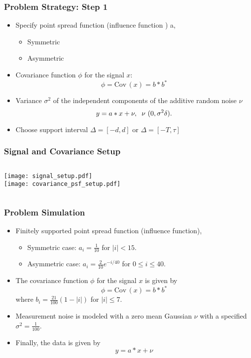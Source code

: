 \documentclass[t]{beamer}
\begin{document}
\begin{frame}
\frametitle{Problem Strategy: Step 1}
\begin{itemize}
\item Specify point spread function (influence function ) a, 
\begin{itemize}
\item Symmetric
\item Asymmetric
\end{itemize}
\item Covariance function $\phi$ for the signal $x$: 
\begin{equation}
\phi = \mathrm{Cov}\,(x) = b*b^{*}
\end{equation}
\item Variance $\sigma^2$ of the independent components of the additive random noise $\nu$
\begin{equation}
y = a*x+\nu, \hspace{.2cm} \nu ~(0,\sigma^2\delta). 
\end{equation}
\item Choose support interval $\Delta = [-d,d] $ or $\Delta = [-T,\tau]$
\end{itemize}
\end{frame}
\begin{frame}
\frametitle{Signal and Covariance Setup}

\begin{columns}[t]
\centering
\texttt{[image: signal\_setup.pdf]}\\
\texttt{[image: covariance\_psf\_setup.pdf]}
\end{columns}

\end{frame}
\begin{frame}
\frametitle{Problem Simulation}
\begin{itemize}
\item Finitely supported point spread function (influence function), 
  \begin{itemize}
    \item Symmetric case: \alert{$a_i = \frac 1{10}$} for $|i| < 15$.  
    \item Asymmetric case: \alert{$a_i = \frac 2{10} e^{-i/40}$} for $0\le i\le 40$.
  \end{itemize}
\item The covariance function $\phi$ for the signal $x$ is given by 
$$
\phi = \mathrm{Cov}\,(x) = b*b^{*}
$$
  where \alert{$b_i = \frac {21}{100}(1-|i|)$} for $|i| \le 7$. 
\item Measurement noise is modeled with a zero mean Gaussian $\nu$ with a specified \alert{$\sigma^2 = \frac 1{100}$}.
\item Finally, the data is given by
$$
  y = a * x + \nu
$$
\end{itemize}
\end{frame}
\end{document}
